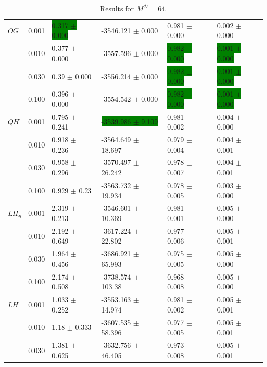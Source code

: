 \documentclass[shortabstract]{iithesis}
\begin{document}
\begin{table}[!ht]
\centering
\caption{Results for $M^{\mathcal D}=64$.}
\vspace{5mm}
\begin{tabular}{llllll}  \hline
$OG$ & 0.001 &    \colorbox{green}{0.317 $\pm$ 0.000} &      -3546.121 $\pm$ 0.000 &    0.981 $\pm$ 0.000 &    0.002 $\pm$ 0.000 \\
        & 0.010 &    0.377 $\pm$ 0.000 &      -3557.596 $\pm$ 0.000 &    \colorbox{green}{0.982 $\pm$ 0.000} &    \colorbox{green}{0.001 $\pm$ 0.000} \\
        & 0.030 &     0.39 $\pm$ 0.000 &      -3556.214 $\pm$ 0.000 &    \colorbox{green}{0.982 $\pm$ 0.000} &    \colorbox{green}{0.001 $\pm$ 0.000} \\
        & 0.100 &    0.396 $\pm$ 0.000 &      -3554.542 $\pm$ 0.000 &    \colorbox{green}{0.982 $\pm$ 0.000} &    \colorbox{green}{0.001 $\pm$ 0.000} \\
$QH$ & 0.001 &  0.795 $\pm$ 0.241 &    \colorbox{green}{-3539.986 $\pm$ 9.109} &  0.981 $\pm$ 0.002 &    0.004 $\pm$ 0.000 \\
        & 0.010 &  0.918 $\pm$ 0.236 &   -3564.649 $\pm$ 18.697 &  0.979 $\pm$ 0.004 &  0.004 $\pm$ 0.001 \\
        & 0.030 &  0.958 $\pm$ 0.296 &   -3570.497 $\pm$ 26.242 &  0.978 $\pm$ 0.007 &  0.004 $\pm$ 0.001 \\
        & 0.100 &   0.929 $\pm$ 0.23 &   -3563.732 $\pm$ 19.934 &  0.978 $\pm$ 0.005 &    0.003 $\pm$ 0.000 \\
$LH_q$ & 0.001 &  2.319 $\pm$ 0.213 &   -3546.601 $\pm$ 10.369 &  0.981 $\pm$ 0.001 &    0.005 $\pm$ 0.000 \\
        & 0.010 &  2.192 $\pm$ 0.649 &   -3617.224 $\pm$ 22.802 &  0.977 $\pm$ 0.006 &  0.005 $\pm$ 0.001 \\
        & 0.030 &  1.964 $\pm$ 0.456 &   -3686.921 $\pm$ 65.993 &  0.975 $\pm$ 0.005 &    0.005 $\pm$ 0.000 \\
        & 0.100 &  2.174 $\pm$ 0.508 &   -3738.574 $\pm$ 103.38 &  0.968 $\pm$ 0.008 &    0.005 $\pm$ 0.000 \\
$LH$ & 0.001 &  1.033 $\pm$ 0.252 &   -3553.163 $\pm$ 14.974 &  0.981 $\pm$ 0.002 &  0.005 $\pm$ 0.001 \\
        & 0.010 &   1.18 $\pm$ 0.333 &   -3607.535 $\pm$ 58.396 &  0.977 $\pm$ 0.005 &  0.005 $\pm$ 0.001 \\
        & 0.030 &  1.381 $\pm$ 0.625 &   -3632.756 $\pm$ 46.405 &  0.973 $\pm$ 0.008 &  0.005 $\pm$ 0.001 \\

\end{tabular}
\end{table}
\end{document}
